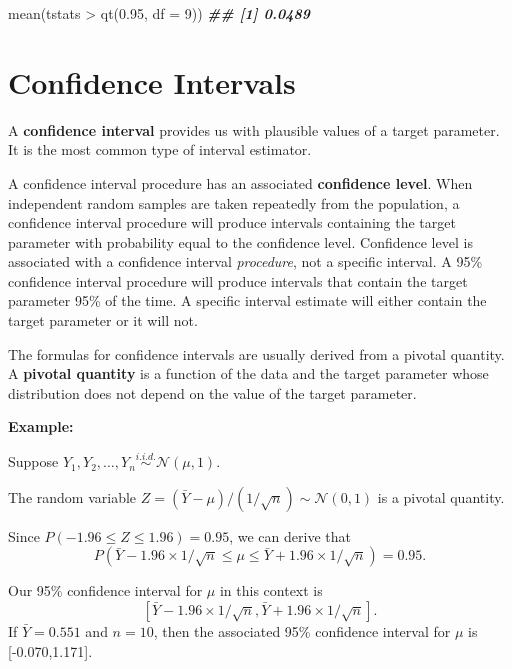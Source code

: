 \documentclass[
]{book}
\newenvironment{Shaded}{\begin{snugshade}}{\end{snugshade}}
\newcommand{\AttributeTok}[1]{\textcolor[rgb]{0.77,0.63,0.00}{#1}}
\newcommand{\DecValTok}[1]{\textcolor[rgb]{0.00,0.00,0.81}{#1}}
\newcommand{\DocumentationTok}[1]{\textcolor[rgb]{0.56,0.35,0.01}{\textbf{\textit{#1}}}}
\newcommand{\FloatTok}[1]{\textcolor[rgb]{0.00,0.00,0.81}{#1}}
\newcommand{\FunctionTok}[1]{\textcolor[rgb]{0.00,0.00,0.00}{#1}}
\newcommand{\NormalTok}[1]{#1}
\newcommand{\SpecialCharTok}[1]{\textcolor[rgb]{0.00,0.00,0.00}{#1}}
\theoremstyle{definition}
\theoremstyle{definition}
\theoremstyle{definition}
\theoremstyle{definition}
\theoremstyle{remark}
\begin{document}
\begin{Shaded}
\begin{Highlighting}[]
\FunctionTok{mean}\NormalTok{(tstats }\SpecialCharTok{\textgreater{}} \FunctionTok{qt}\NormalTok{(}\FloatTok{0.95}\NormalTok{, }\AttributeTok{df =} \DecValTok{9}\NormalTok{))}
\DocumentationTok{\#\# [1] 0.0489}
\end{Highlighting}
\end{Shaded}

\hypertarget{confidence-intervals}{%
\section{Confidence Intervals}\label{confidence-intervals}}

A \textbf{confidence interval} provides us with plausible values of a target parameter. It is the most common type of interval estimator.

A confidence interval procedure has an associated \textbf{confidence level}. When independent random samples are taken repeatedly from the population, a confidence interval procedure will produce intervals containing the target parameter with probability equal to the confidence level. Confidence level is associated with a confidence interval \emph{procedure}, not a specific interval. A 95\% confidence interval procedure will produce intervals that contain the target parameter 95\% of the time. A specific interval estimate will either contain the target parameter or it will not.

The formulas for confidence intervals are usually derived from a pivotal quantity. A \textbf{pivotal quantity} is a function of the data and the target parameter whose distribution does not depend on the value of the target
parameter.

\textbf{Example:}

Suppose \(Y_1,Y_2,\ldots,Y_n \stackrel{i.i.d.}{\sim} \mathcal{N}(\mu, 1)\).

The random variable \(Z=(\bar{Y}-\mu)/(1/\sqrt{n})\sim \mathcal{N}(0,1)\) is a pivotal quantity.

Since \(P(-1.96\leq Z\leq 1.96)=0.95\), we can derive that
\[
P(\bar{Y}-1.96\times 1/\sqrt{n}\leq \mu \leq \bar{Y}+1.96\times 1/\sqrt{n})=0.95.
\]

Our 95\% confidence interval for \(\mu\) in this context is
\[
[\bar{Y}-1.96\times 1/\sqrt{n}, \bar{Y}+1.96\times 1/\sqrt{n}].
\]
If \(\bar{Y}=0.551\) and \(n=10\), then the associated 95\% confidence interval for \(\mu\) is {[}-0.070,1.171{]}.
\end{document}
